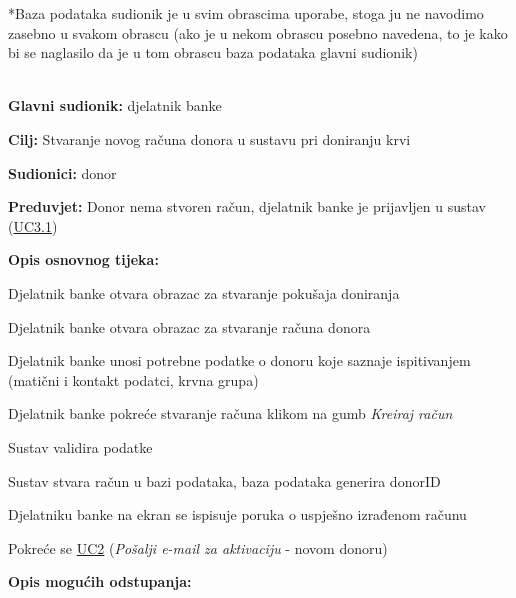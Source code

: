                 \par {
                    *Baza podataka sudionik je u svim obrascima uporabe, stoga ju ne navodimo zasebno u svakom obrascu (ako je u nekom obrascu posebno navedena, to je kako bi se naglasilo da je u tom obrascu baza podataka glavni sudionik)
                } \\ \\
					\noindent {} \label{UC1.1}
					\begin{packed_item}
	
						\item \textbf{Glavni sudionik: }djelatnik banke
						\item  \textbf{Cilj:} Stvaranje novog računa donora u sustavu pri doniranju krvi
						\item  \textbf{Sudionici:} donor
						\item  \textbf{Preduvjet:} Donor nema stvoren račun, djelatnik banke je prijavljen u sustav (\hyperref[UC3.1]{UC3.1})
						\item  \textbf{Opis osnovnog tijeka:}
						
						\item[] \begin{packed_enum}
							\item Djelatnik banke otvara obrazac za stvaranje pokušaja doniranja
							\item Djelatnik banke otvara obrazac za stvaranje računa donora
							\item Djelatnik banke unosi potrebne podatke o donoru koje saznaje ispitivanjem (matični i kontakt podatci, krvna grupa)
							\item Djelatnik banke pokreće stvaranje računa klikom na gumb \textit{Kreiraj račun}
							\item Sustav validira podatke
							\item Sustav stvara račun u bazi podataka, baza podataka generira donorID
							\item Djelatniku banke na ekran se ispisuje poruka o uspješno izrađenom računu
							\item Pokreće se \hyperref[UC2]{UC2} (\textit{Pošalji e-mail za aktivaciju} - novom donoru)
						\end{packed_enum}
						
						\item  \textbf{Opis mogućih odstupanja:}
						
						\item[] \begin{packed_item}
	

\end{packed_item}
\end{packed_item}
